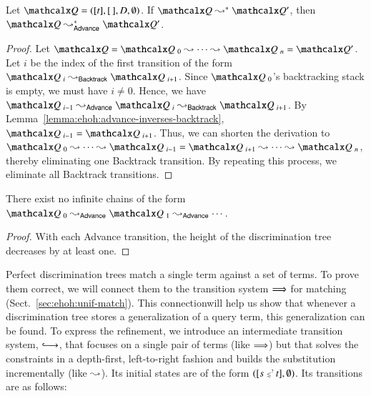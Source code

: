 \begin{lemma}\label{lemma:ehoh:backtrack-remove}
  Let $\quadruple = ([t], [\,], D, \emptyset)$. If $\quadruple
  \Pdtarrow^* \quadruple'$, then $\quadruple \Pdtarrow_{\mathsf{Advance}}^*\allowbreak
  \quadruple'$.
\end{lemma}
  
\begin{proof}
  Let $\quadruple = \quadruple{}_{\,\,0} \Pdtarrow \cdots \Pdtarrow \quadruple{}_{\,\,n} = \quadruple'$.
  Let $i$ be the index of the first transition of the form $\quadruple{}_{\,\,i} \Pdtarrow_{\mathsf{Backtrack}}
  \quadruple{}_{\,\,i+1}$. Since $\quadruple{}_{\,\,0}$'s backtracking stack is empty, we must
  have $i \not= 0$. Hence, we have $\quadruple{}_{\,\,i-1} \Pdtarrow_{\mathsf{Advance}}
  \quadruple{}_{\,\,i} \Pdtarrow_{\mathsf{Backtrack}} \quadruple{}_{\,\,i+1}$. By
  Lemma~\ref{lemma:ehoh:advance-inverses-backtrack}, $\quadruple{}_{\,\,i-1} =
  \quadruple{}_{\,\,i+1}$. Thus, we can shorten the derivation to $\quadruple{}_{\,\,0}
  \Pdtarrow \cdots \Pdtarrow \quadruple{}_{\,\,i-1} = \quadruple{}_{\,\,i+1} \Pdtarrow
  \cdots \Pdtarrow \quadruple{}_{\,\,n}$,
  thereby eliminating one \textsf{Backtrack} transition. By repeating this
  process, we eliminate all \textsf{Backtrack} transitions.
\end{proof}

\begin{lemma}\label{lemma:ehoh:termination-pdt}
  There exist no infinite chains of the form
  $\quadruple{}_{\,\,0} \Pdtarrow_\mathsf{Advance}\allowbreak \quadruple{}_{\,\,1} \Pdtarrow_\mathsf{Advance}
  \cdots$.
\end{lemma}
\begin{proof}
  With each \textsf{Advance} transition, the height of the discrimination tree
  decreases by at least one.
\end{proof}


Perfect discrimination trees match a single term against a set of terms. To
prove them correct, we will connect them to the transition system
$\Longrightarrow$ for matching (Sect.~\ref{sec:ehoh:unif-match}). This connection\pagebreak[2] will
help us show that whenever a discrimination tree stores a generalization of a
query term, this generalization can be found.
%
To express the refinement, we introduce an intermediate transition
system, $\Matchiiarrow$, that focuses on a single pair of terms (like
$\Longrightarrow$) but that solves the constraints in a depth-first, left-to-right
fashion and builds the substitution incrementally (like $\leadsto$).
Its initial states are of the form $([s \mathrel{{\scriptstyle\lesssim}^{\scriptscriptstyle{?\!}}} t], \emptyset)$. Its transitions
are as follows:

